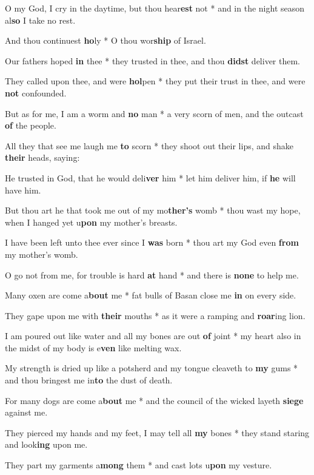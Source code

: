 \begin{multicols}{2}
	O my God, I cry in the daytime, but thou hear\textbf{est} not * and in the night season al\textbf{so} I take no rest.
	
	And thou continuest \textbf{ho}ly * O thou wor\textbf{ship} of Israel.
	
	Our fathers hoped \textbf{in} thee * they trusted in thee, and thou \textbf{didst} deliver them.
	
	They called upon thee, and were \textbf{hol}pen * they put their trust in thee, and were \textbf{not} confounded.
	
	But as for me, I am a worm and \textbf{no} man * a very scorn of men, and the outcast \textbf{of} the people.
	
	All they that see me laugh me \textbf{to} scorn * they shoot out their lips, and shake \textbf{their} heads, saying:
	
	He trusted in God, that he would deli\textbf{ver} him * let him deliver him, if \textbf{he} will have him.
	
	But thou art he that took me out of my mo\textbf{ther's} womb * thou wast my hope, when I hanged yet u\textbf{pon} my mother's breasts.
	
	I have been left unto thee ever since I \textbf{was} born * thou art my God even \textbf{from} my mother's womb.
	
	O go not from me, for trouble is hard \textbf{at} hand * and there is \textbf{none} to help me.
	
	Many oxen are come a\textbf{bout} me * fat bulls of Basan close me \textbf{in} on every side.
	
	They gape upon me with \textbf{their} mouths * as it were a ramping and \textbf{roar}ing lion.
	
	I am poured out like water and all my bones are out \textbf{of} joint * my heart also in the midst of my body is e\textbf{ven} like melting wax.
	
	My strength is dried up like a potsherd and my tongue cleaveth to \textbf{my} gums * and thou bringest me in\textbf{to} the dust of death.
	
	For many dogs are come a\textbf{bout} me * and the council of the wicked layeth \textbf{siege} against me.
	
	They pierced my hands and my feet, I may tell all \textbf{my} bones * they stand staring and look\textbf{ing} upon me.
	
	They part my garments a\textbf{mong} them * and cast lots u\textbf{pon} my vesture.
	

\end{multicols}
